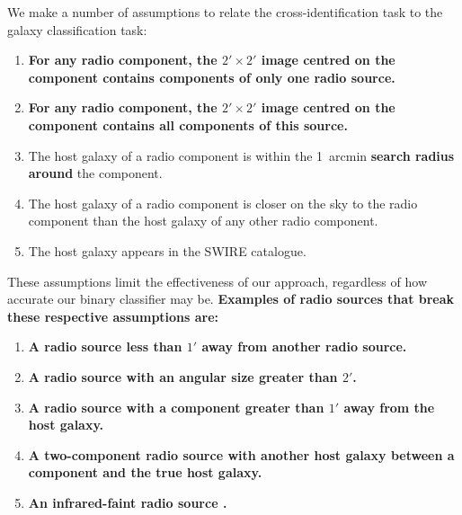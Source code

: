 \documentclass[fleqn,usenatbib,usedcolumn]{mnras}
\newcommand{\edited}[1]{{\bf {#1}}}
\begin{document}
    We make a number of assumptions to relate the cross-identification task to
    the galaxy classification task:
    \begin{enumerate}
      \item \edited{For any radio component, the $2' \times 2'$ image centred on the component contains components of only one radio source.}
      \item \edited{For any radio component, the $2' \times 2'$ image centred on the component contains all components of this source.}
      \item The host galaxy of a radio component is within the 1~arcmin \edited{search radius around} the
        component.
      \item The host galaxy of a radio component is closer on the sky to the
        radio component than the host galaxy of any other radio component.
      \item The host galaxy appears in the SWIRE catalogue.
    \end{enumerate}
    These assumptions limit the effectiveness of our approach, regardless of
    how accurate our binary classifier may be. \edited{Examples of radio sources that break these respective assumptions are:}
    \begin{enumerate}
      \item \edited{A radio source less than $1'$ away from another radio source.}
      \item \edited{A radio source with an angular size greater than $2'$.}
      \item \edited{A radio source with a component greater than $1'$ away from the host galaxy.}
      \item \edited{A two-component radio source with another host galaxy between a component and the true host galaxy.}
      \item \edited{An infrared-faint radio source \citep[as in][]{collier14irfaint}.}
    \end{enumerate}
\end{document}

